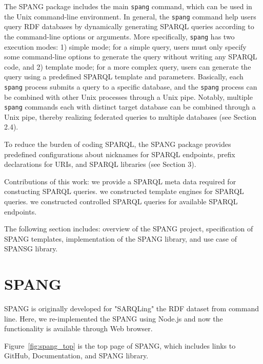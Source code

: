 \documentclass[runningheads]{llncs}
\begin{document}
The SPANG package includes the main {\tt spang} command, which can be used in the Unix command-line environment.
In general, the {\tt spang} command help users query RDF databases by dynamically generating SPARQL queries according to the command-line options or arguments. 
More specifically, {\tt spang} has two execution modes: 
1) simple mode; for a simple query, users must only specify some command-line options to generate the query without writing any SPARQL code, and
2) template mode; for a more complex query, users can generate the query using a predefined SPARQL template and parameters.
Basically, each {\tt spang} process submits a query to a specific database,
and the {\tt spang} process can be combined with other Unix processes through a Unix pipe. 
Notably, multiple {\tt spang} commands each with distinct target database can be combined through a Unix pipe, thereby realizing federated queries to multiple databases (see Section 2.4). 

To reduce the burden of coding SPARQL, the SPANG package provides predefined configurations about nicknames for SPARQL endpoints, prefix declarations for URIs, and SPARQL libraries (see Section 3).


Contributions of this work:
we provide a SPARQL meta data required for constucting SPARQL queries.
we constructed template engines for SPARQL queries.
we constructed controlled SPARQL queries for available SPARQL endpoints.


The following section includes: overview of the SPANG project, specification of SPANG templates, implementation of the SPANG library, and use case of SPANSG library.


\section{SPANG}
SPANG is originally developed for "SARQLing" the RDF dataset from command line. Here, we re-implemented the SPANG using Node.js and now the functionality is available through Web browser. 

Figure~\ref{fig:spang_top} is the top page of SPANG, which includes links to GitHub, Documentation, and SPANG library.
\end{document}
